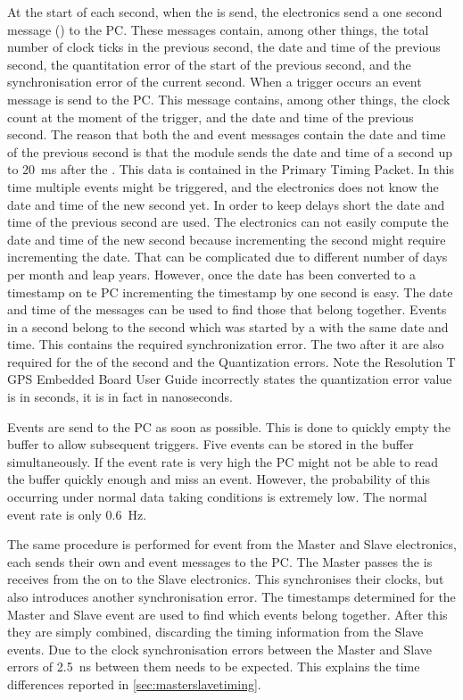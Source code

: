 At the start of each second, when the \pps is send, the \hisparc electronics send a one second message (\osm) to the PC. These messages contain, among other things, the total number of clock ticks in the previous second, the date and time of the previous second, the quantitation error of the start of the previous second, and the synchronisation error of the current second. When a trigger occurs an event message is send to the PC. This message contains, among other things, the clock count at the moment of the trigger, and the date and time of the previous second. The reason that both the \osm and event messages contain the date and time of the previous second is that the \gps module sends the date and time of a second up to \SI{20}{\milli\second} after the \pps. This data is contained in the Primary Timing Packet. In this time multiple events might be triggered, and the electronics does not know the date and time of the new second yet. In order to keep delays short the date and time of the previous second are used. The electronics can not easily compute the date and time of the new second because incrementing the second might require incrementing the date. That can be complicated due to different number of days per month and leap years. However, once the date has been converted to a timestamp on te PC incrementing the timestamp by one second is easy. The date and time of the messages can be used to find those that belong together. Events in a second belong to the second which was started by a \osm with the same date and time. This \osm contains the required synchronization error. The two \osm after it are also required for the \ctp of the second and the Quantization errors. Note the Resolution T GPS Embedded Board User Guide incorrectly states the quantization error value is in seconds, it is in fact in nanoseconds.

Events are send to the PC as soon as possible. This is done to quickly empty the buffer to allow subsequent triggers. Five events can be stored in the buffer simultaneously. If the event rate is very high the PC might not be able to read the buffer quickly enough and miss an event. However, the probability of this occurring under normal data taking conditions is extremely low. The normal event rate is only \SI{0.6}{\hertz}.

The same procedure is performed for event from the Master and Slave electronics, each sends their own \osm and event messages to the PC. The Master passes the \pps is receives from the \gps on to the Slave electronics. This synchronises their clocks, but also introduces another synchronisation error. The timestamps determined for the Master and Slave event are used to find which events belong together. After this they are simply combined, discarding the timing information from the Slave events. Due to the clock synchronisation errors between the Master and Slave errors of \SI{2.5}{\ns} between them needs to be expected. This explains the time differences reported in \cref{sec:masterslavetiming}.


